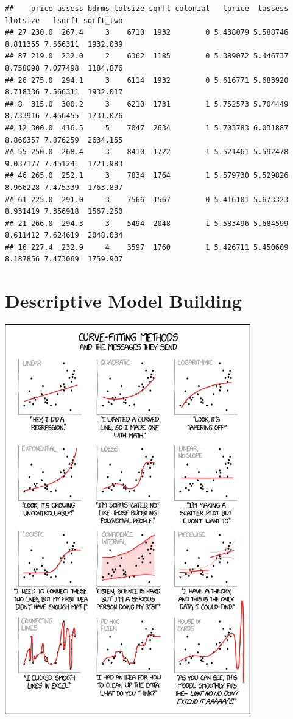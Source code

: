 \documentclass[
]{book}
\theoremstyle{definition}
\theoremstyle{definition}
\theoremstyle{definition}
\theoremstyle{definition}
\theoremstyle{remark}
\begin{document}
\begin{verbatim}
##    price assess bdrms lotsize sqrft colonial   lprice  lassess llotsize   lsqrft sqrft_two
## 27 230.0  267.4     3    6710  1932        0 5.438079 5.588746 8.811355 7.566311  1932.039
## 87 219.0  232.0     2    6362  1185        0 5.389072 5.446737 8.758098 7.077498  1184.876
## 26 275.0  294.1     3    6114  1932        0 5.616771 5.683920 8.718336 7.566311  1932.017
## 8  315.0  300.2     3    6210  1731        1 5.752573 5.704449 8.733916 7.456455  1731.076
## 12 300.0  416.5     5    7047  2634        1 5.703783 6.031887 8.860357 7.876259  2634.155
## 55 250.0  268.4     3    8410  1722        1 5.521461 5.592478 9.037177 7.451241  1721.983
## 46 265.0  252.1     3    7834  1764        1 5.579730 5.529826 8.966228 7.475339  1763.897
## 61 225.0  291.0     3    7566  1567        0 5.416101 5.673323 8.931419 7.356918  1567.250
## 21 266.0  294.3     3    5494  2048        1 5.583496 5.684599 8.611412 7.624619  2048.034
## 16 227.4  232.9     4    3597  1760        1 5.426711 5.450609 8.187856 7.473069  1759.907
\end{verbatim}

\hypertarget{descriptive-model-building}{%
\chapter{Descriptive Model Building}\label{descriptive-model-building}}

\includegraphics[width=0.8\textwidth,height=\textheight]{./images/curve_fitting.png}
\end{document}
